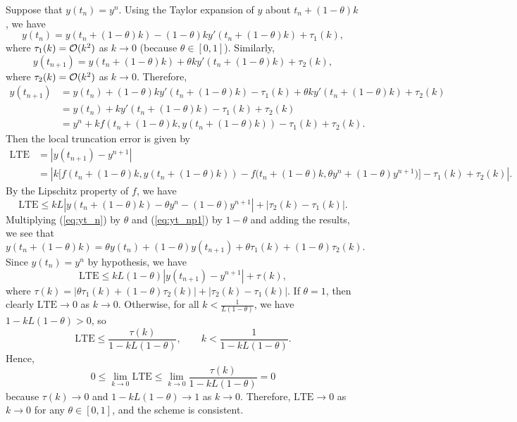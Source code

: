 \documentclass{homework}
\begin{document}
\begin{enumerate}
		Suppose that $y(t_n) = y^n$. Using the Taylor expansion of $y$ about $t_n + (1-\theta)k$, we have
		\begin{equation}
			\label{eq:yt_n}
			y(t_n) = y(t_n + (1-\theta)k) - (1-\theta)ky'(t_n + (1-\theta)k) + \tau_1(k),
		\end{equation}
		where $\tau_1(k) = \mathcal{O}(k^2)$ as $k \to 0$ (because $\theta \in [0,1]$). Similarly,
		\begin{equation}
			\label{eq:yt_np1}
			y(t_{n+1}) = y(t_n + (1-\theta)k) + \theta ky'(t_n + (1-\theta)k) + \tau_2(k),
		\end{equation}
		where $\tau_2(k) = \mathcal{O}(k^2)$ as $k \to 0$. Therefore,
		\begin{align*}
			y(t_{n+1}) &= y(t_n) + (1-\theta)ky'(t_n+(1-\theta)k) -\tau_1(k) + \theta ky'(t_n+(1-\theta)k) + \tau_2(k) \\
			&= y(t_n) + ky'(t_n + (1-\theta)k) - \tau_1(k) + \tau_2(k) \\
			&= y^n + kf(t_n + (1-\theta)k, y(t_n+(1-\theta)k)) -\tau_1(k) + \tau_2(k).
		\end{align*}
		Then the local truncation error is given by
		\begin{align*}
			\text{LTE} &= \left|y(t_{n+1}) - y^{n+1}\right| \\
			&= \left|k\big[f(t_n+(1-\theta)k, y(t_n+(1-\theta)k)) - f\big(t_n+(1-\theta)k, \theta y^n + (1-\theta)y^{n+1}\big)\big] -\tau_1(k) + \tau_2(k)\right|.
		\end{align*}
		By the Lipschitz property of $f$, we have
		\begin{equation*}
			\text{LTE} \le kL\left|y(t_n + (1-\theta)k) - \theta y^n - (1-\theta)y^{n+1}\right| + |\tau_2(k) - \tau_1(k)|.
		\end{equation*}
		Multiplying (\ref{eq:yt_n}) by $\theta$ and (\ref{eq:yt_np1}) by $1-\theta$ and adding the results, we see that
		\begin{equation*}
			y(t_n+(1-\theta)k) = \theta y(t_n) + (1-\theta)y(t_{n+1}) + \theta\tau_1(k) + (1-\theta)\tau_2(k).
		\end{equation*}
		Since $y(t_n) = y^n$ by hypothesis, we have
		\begin{equation*}
			\text{LTE} \le kL(1-\theta)\left|y(t_{n+1}) - y^{n+1}\right| + \tau(k),
		\end{equation*}
		where $\tau(k) = \left|\theta \tau_1(k) + (1-\theta)\tau_2(k)\right| + \left|\tau_2(k) - \tau_1(k)\right|$. If $\theta = 1$, then clearly $\text{LTE} \to 0$ as $k \to 0$. Otherwise, for all $k < \frac{1}{L(1-\theta)}$, we have $1 - kL(1-\theta) > 0$, so
		\begin{equation*}
			\text{LTE} \le \frac{\tau(k)}{1-kL(1-\theta)}, \qquad k < \frac{1}{1 - kL(1-\theta)}.
		\end{equation*}
		Hence,
		\begin{equation*}
			0 \le \lim_{k\to 0}\text{LTE} \le \lim_{k\to 0}\frac{\tau(k)}{1-kL(1-\theta)} = 0
		\end{equation*}
		because $\tau(k) \to 0$ and $1-kL(1-\theta) \to 1$ as $k \to 0$. Therefore, $\text{LTE} \to 0$ as $k \to 0$ for any $\theta \in [0,1]$, and the scheme is consistent.
	\end{enumerate}
	
\end{document}
